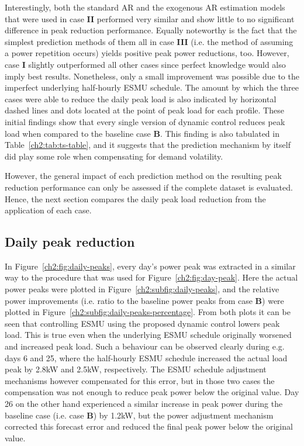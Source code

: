 Interestingly, both the standard AR and the exogenous AR estimation models that were used in case \textbf{II} performed very similar and show little to no significant difference in peak reduction performance.
Equally noteworthy is the fact that the simplest prediction methods of them all in case \textbf{III} (i.e. the method of assuming a power repetition occurs) yields positive peak power reductions, too.
However, case \textbf{I} slightly outperformed all other cases since perfect knowledge would also imply best results.
Nonetheless, only a small improvement was possible due to the imperfect underlying half-hourly ESMU schedule.
The amount by which the three cases were able to reduce the daily peak load is also indicated by horizontal dashed lines and dots located at the point of peak load for each profile.
These initial findings show that every single version of dynamic control reduces peak load when compared to the baseline case \textbf{B}.
This finding is also tabulated in Table~\ref{ch2:tab:ts-table}, and it suggests that the prediction mechanism by itself did play some role when compensating for demand volatility.



However, the general impact of each prediction method on the resulting peak reduction performance can only be assessed if the complete dataset is evaluated.
Hence, the next section compares the daily peak load reduction from the application of each case.

\subsection{Daily peak reduction}



In Figure~\ref{ch2:fig:daily-peaks}, every day's power peak was extracted in a similar way to the procedure that was used for Figure~\ref{ch2:fig:day-peak}.
Here the actual power peaks were plotted in Figure~\ref{ch2:subfig:daily-peaks}, and the relative power improvements (i.e. ratio to the baseline power peaks from case \textbf{B}) were plotted in Figure~\ref{ch2:subfig:daily-peaks-percentage}.
From both plots it can be seen that controlling ESMU using the proposed dynamic control lowers peak load.
This is true even when the underlying ESMU schedule originally worsened and increased peak load.
Such a behaviour can be observed clearly during e.g. days 6 and 25, where the half-hourly ESMU schedule increased the actual load peak by 2.8kW and 2.5kW, respectively.
The ESMU schedule adjustment mechanisms however compensated for this error, but in those two cases the compensation was not enough to reduce peak power below the original value.
Day 26 on the other hand experienced a similar increase in peak power during the baseline case (i.e. case \textbf{B}) by 1.2kW, but the power adjustment mechanism corrected this forecast error and reduced the final peak power below the original value.

